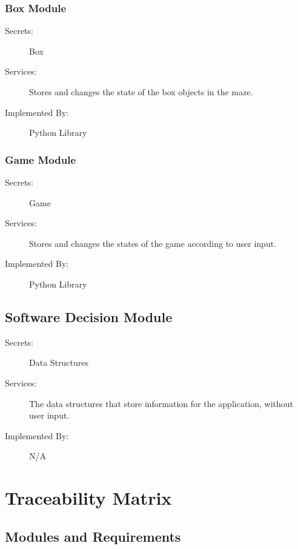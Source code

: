 \documentclass[12pt, titlepage]{article}
\begin{document}
\subsubsection{Box Module}
\begin{description}
\item[Secrets:] Box
\item[Services:] Stores and changes the state of the box objects in the maze.
\item[Implemented By:] Python Library
\end{description}

\subsubsection{Game Module}
\begin{description}
\item[Secrets:] Game
\item[Services:] Stores and changes the states of the game according to user input.
\item[Implemented By:] Python Library
\end{description}

\subsection{Software Decision Module}

\begin{description}
\item[Secrets:] Data Structures
\item[Services:] The data structures that store information for the application, without user input. 
\item[Implemented By:] N/A
\end{description}

\section{Traceability Matrix} \label{SecTM}

\subsection{Modules and Requirements}
\end{document}
